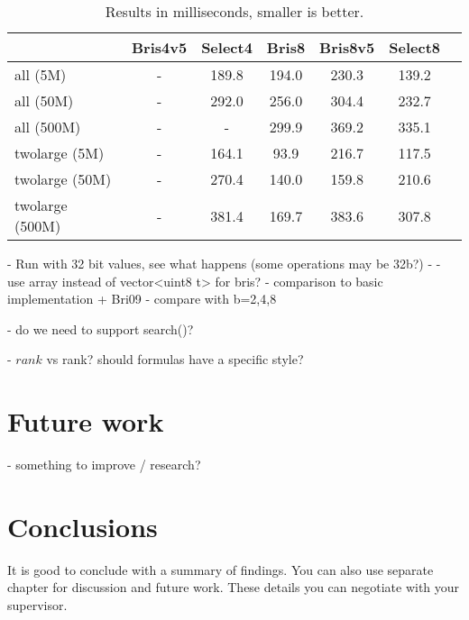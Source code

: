 \begin{table}
\centering
\caption{Results in milliseconds, smaller is better.\label{table:results1}}
\begin{tabular}{l||c c c c c c} 
 & Bris4v5 & Select4 & Bris8 & Bris8v5 & Select8 \\ 
\hline \hline 
all (5M)        & - & 189.8 & 194.0 & 230.3 & 139.2 \\
all (50M)       & - & 292.0 & 256.0 & 304.4 & 232.7 \\
all (500M)      & - &  -    & 299.9 & 369.2 & 335.1 \\
twolarge (5M)   & - & 164.1 & 93.9  & 216.7 & 117.5 \\
twolarge (50M)  & - & 270.4 & 140.0 & 159.8 & 210.6 \\
twolarge (500M) & - & 381.4 & 169.7 & 383.6 & 307.8 \\


\hline
%
\end{tabular}
\end{table}



 - Run with 32 bit values, see what happens (some operations may be 32b?)
 - 
 - use array instead of vector<uint8 t> for bris?
- comparison to basic implementation + Bri09
  - compare with b=2,4,8

 - do we need to support search()?

 - $rank$ vs rank? should formulas have a specific style?

\chapter{Future work}
 - something to improve / research?

\chapter{Conclusions\label{chapter:conclusions}}

It is good to conclude with a summary of findings. You can also use separate chapter for discussion and future work. These details you can negotiate with your supervisor.
